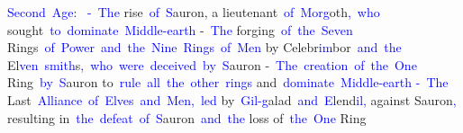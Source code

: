 \documentclass{article}
\begin{document}
\begin{tcolorbox}[colframe=black,colback=white]
{}\textcolor{blue}{Second}\textcolor{blue}{~Age}:\textcolor{blue}{~
}\textcolor{blue}{-}\textcolor{blue}{~The} rise\textcolor{blue}{~of}\textcolor{blue}{~S}auron, a lieutenant\textcolor{blue}{~of}\textcolor{blue}{~Morg}oth\textcolor{blue}{,}\textcolor{blue}{~who} sought\textcolor{blue}{~to}\textcolor{blue}{~dominate}\textcolor{blue}{~Middle}\textcolor{blue}{-earth}\textcolor{blue}{
}-\textcolor{blue}{~The} forging\textcolor{blue}{~of}\textcolor{blue}{~the}\textcolor{blue}{~Seven} Rings\textcolor{blue}{~of}\textcolor{blue}{~Power}\textcolor{blue}{~and}\textcolor{blue}{~the}\textcolor{blue}{~Nine}\textcolor{blue}{~Rings}\textcolor{blue}{~of}\textcolor{blue}{~Men} by Celebr\textcolor{blue}{im}bor\textcolor{blue}{~and}\textcolor{blue}{~the} El\textcolor{blue}{ven}\textcolor{blue}{~smith}s\textcolor{blue}{,}\textcolor{blue}{~who}\textcolor{blue}{~were}\textcolor{blue}{~deceived}\textcolor{blue}{~by}\textcolor{blue}{~S}auron\textcolor{blue}{
}-\textcolor{blue}{~The}\textcolor{blue}{~creation}\textcolor{blue}{~of}\textcolor{blue}{~the}\textcolor{blue}{~One} Ring\textcolor{blue}{~by}\textcolor{blue}{~S}auron to\textcolor{blue}{~rule}\textcolor{blue}{~all}\textcolor{blue}{~the}\textcolor{blue}{~other}\textcolor{blue}{~rings} and\textcolor{blue}{~dominate}\textcolor{blue}{~Middle}\textcolor{blue}{-earth}
\textcolor{blue}{-}\textcolor{blue}{~The} Last\textcolor{blue}{~Alliance}\textcolor{blue}{~of}\textcolor{blue}{~Elves}\textcolor{blue}{~and}\textcolor{blue}{~Men}\textcolor{blue}{,}\textcolor{blue}{~led} by\textcolor{blue}{~Gil}\textcolor{blue}{-g}alad\textcolor{blue}{~and}\textcolor{blue}{~El}end\textcolor{blue}{il}\textcolor{blue}{,} against Sauron\textcolor{blue}{,} resulting in\textcolor{blue}{~the}\textcolor{blue}{~defeat}\textcolor{blue}{~of}\textcolor{blue}{~S}auron\textcolor{blue}{~and}\textcolor{blue}{~the} loss of\textcolor{blue}{~the}\textcolor{blue}{~One} Ring\textcolor{blue}{

}
\end{tcolorbox}
\end{document}
